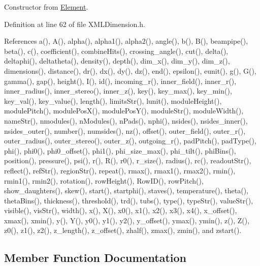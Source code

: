 Constructor from \hyperlink{class_d_d4hep_1_1_x_m_l_1_1_element}{Element}. 



Definition at line 62 of file X\+M\+L\+Dimension.\+h.



References a(), A(), alpha(), alpha1(), alpha2(), angle(), b(), B(), beampipe(), beta(), c(), coefficient(), combine\+Hits(), crossing\+\_\+angle(), cut(), delta(), deltaphi(), deltatheta(), density(), depth(), dim\+\_\+x(), dim\+\_\+y(), dim\+\_\+z(), dimensions(), distance(), dr(), dx(), dy(), dz(), end(), epsilon(), eunit(), g(), G(), gamma(), gap(), height(), I(), id(), incoming\+\_\+r(), inner\+\_\+field(), inner\+\_\+r(), inner\+\_\+radius(), inner\+\_\+stereo(), inner\+\_\+z(), key(), key\+\_\+max(), key\+\_\+min(), key\+\_\+val(), key\+\_\+value(), length(), limits\+Str(), lunit(), module\+Height(), module\+Pitch(), module\+Pos\+X(), module\+Pos\+Y(), module\+Str(), module\+Width(), name\+Str(), nmodules(), n\+Modules(), n\+Pads(), nphi(), nsides(), nsides\+\_\+inner(), nsides\+\_\+outer(), number(), numsides(), nz(), offset(), outer\+\_\+field(), outer\+\_\+r(), outer\+\_\+radius(), outer\+\_\+stereo(), outer\+\_\+z(), outgoing\+\_\+r(), pad\+Pitch(), pad\+Type(), phi(), phi0(), phi0\+\_\+offset(), phi1(), phi\+\_\+size\+\_\+max(), phi\+\_\+tilt(), phi\+Bins(), position(), pressure(), psi(), r(), R(), r0(), r\+\_\+size(), radius(), rc(), readout\+Str(), reflect(), ref\+Str(), region\+Str(), repeat(), rmax(), rmax1(), rmax2(), rmin(), rmin1(), rmin2(), rotation(), row\+Height(), Row\+I\+D(), row\+Pitch(), show\+\_\+daughters(), skew(), start(), startphi(), staves(), temperature(), theta(), theta\+Bins(), thickness(), threshold(), trd(), tubs(), type(), type\+Str(), value\+Str(), visible(), vis\+Str(), width(), x(), X(), x0(), x1(), x2(), x3(), x4(), x\+\_\+offset(), xmax(), xmin(), y(), Y(), y0(), y1(), y2(), y\+\_\+offset(), ymax(), ymin(), z(), Z(), z0(), z1(), z2(), z\+\_\+length(), z\+\_\+offset(), zhalf(), zmax(), zmin(), and zstart().



\subsection{Member Function Documentation}
\hypertarget{struct_d_d4hep_1_1_x_m_l_1_1_dimension_ac4ee6372c397130c2565d9c5bae40118}{}\label{struct_d_d4hep_1_1_x_m_l_1_1_dimension_ac4ee6372c397130c2565d9c5bae40118} 
